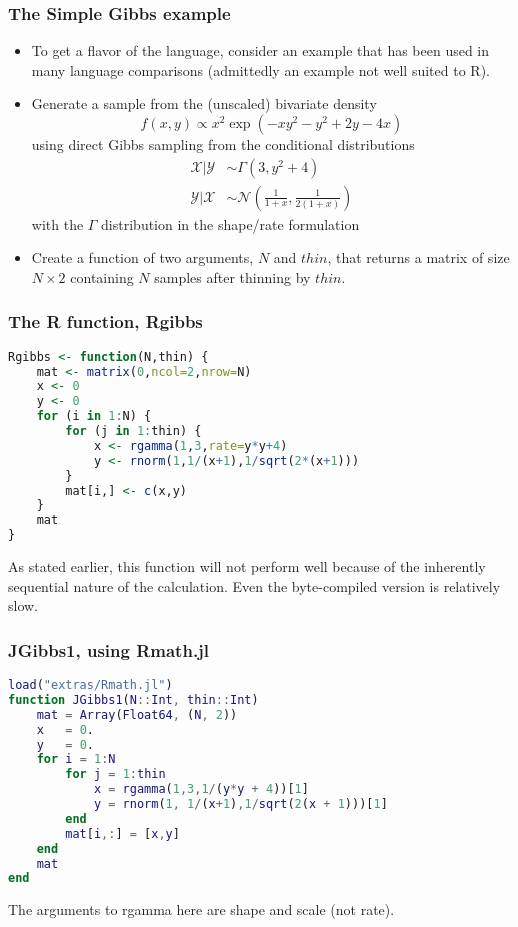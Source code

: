 \documentclass[dvipsnames,pdflatex,beamer]{beamer}
\makeatletter
\newcommand\code{\bgroup\@codex}
\def\@codex#1{{\normalfont\ttfamily\hyphenchar\font=-1 #1}\egroup}
\makeatother
\begin{document}
\begin{frame}
  \frametitle{The Simple Gibbs example}
  \begin{itemize}
  \item To get a flavor of the language, consider an example that has
    been used in many language comparisons (admittedly an example not
    well suited to R).
  \item Generate a sample from the (unscaled) bivariate density
    \begin{displaymath}
      f(x,y) \propto x^2 \exp(-xy^2 - y^2 + 2y - 4x)
    \end{displaymath}
    using direct Gibbs sampling from the conditional distributions
    \begin{displaymath}
      \begin{aligned}
      \mathcal{X}|\mathcal{Y} &\sim \Gamma(3, y^2 +4)\\
      \mathcal{Y}|\mathcal{X} &\sim \mathcal{N}\left(\frac{1}{1+x},\frac{1}{2(1+x)}\right)
      \end{aligned}
    \end{displaymath}
    with the $\Gamma$ distribution in the shape/rate formulation
  \item Create a function of two arguments, $N$ and $\mathit{thin}$,
    that returns a matrix of size $N\times 2$ containing $N$ samples
    after thinning by  $\mathit{thin}$.
  \end{itemize}
\end{frame}
\begin{frame}[fragile]
  \frametitle{The R function, Rgibbs}
\begin{lstlisting}[language=R]
Rgibbs <- function(N,thin) {
    mat <- matrix(0,ncol=2,nrow=N)
    x <- 0
    y <- 0
    for (i in 1:N) {
        for (j in 1:thin) {
            x <- rgamma(1,3,rate=y*y+4)
            y <- rnorm(1,1/(x+1),1/sqrt(2*(x+1)))
        }
        mat[i,] <- c(x,y)
    }
    mat
}
\end{lstlisting}
  As stated earlier, this function will not perform well because of
  the inherently sequential nature of the calculation.  Even the
  byte-compiled version is relatively slow.
\end{frame}
\begin{frame}[fragile]
  \frametitle{JGibbs1, using Rmath.jl}
\begin{lstlisting}[language=Matlab]
load("extras/Rmath.jl")
function JGibbs1(N::Int, thin::Int)
    mat = Array(Float64, (N, 2))
    x   = 0.
    y   = 0.
    for i = 1:N
        for j = 1:thin
            x = rgamma(1,3,1/(y*y + 4))[1]
            y = rnorm(1, 1/(x+1),1/sqrt(2(x + 1)))[1]
        end
        mat[i,:] = [x,y]
    end
    mat
end
\end{lstlisting}
The arguments to \code{rgamma} here are shape and scale (not rate).
\end{frame}
\end{document}
